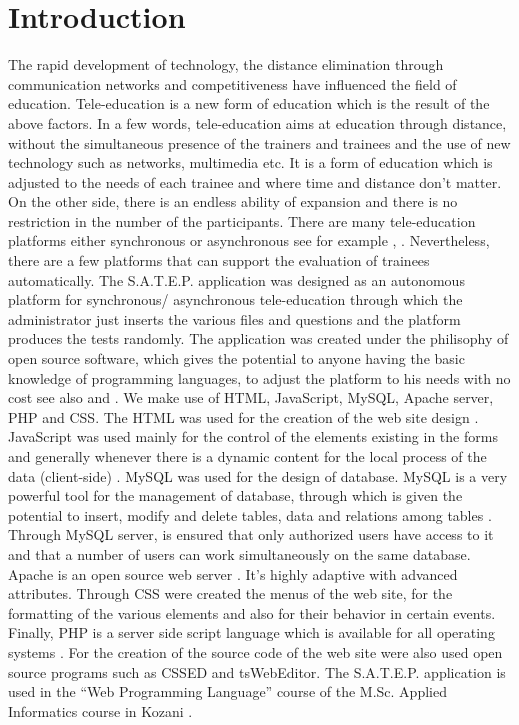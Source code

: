 \documentclass[10pt, conference, compsocconf]{IEEEtran}
\begin{document}
\section{Introduction}
The rapid development of technology, the distance elimination through communication networks and competitiveness have influenced the field of education. Tele-education is a new form of education which is the result of the above factors. In a few words, tele-education aims at education through distance, without the simultaneous presence of the trainers and trainees and the use of new technology such as networks, multimedia etc. It is a form of education which is adjusted to the needs of each trainee and where time and distance don’t matter. On the other side, there is an endless ability of expansion  and there is no restriction in the number of the participants. There are many tele-education platforms either synchronous or asynchronous see for example \cite{Tele1}, \cite{Tele2}. Nevertheless, there are a few platforms that can support the evaluation of trainees automatically.  The S.A.T.E.P. application was designed  as an autonomous platform for synchronous/ asynchronous tele-education  through which the administrator just inserts the various files and questions  and the platform  produces the tests randomly. The application was created under the philisophy of open source software, which gives the potential to anyone having the basic knowledge of programming languages, to adjust the platform to his needs with no cost see also \cite{Skordas_Fragulis_Triant2011} and \cite{Skordas_Fragulis_Triant2014} . We make use  of HTML, JavaScript, MySQL, Apache server, PHP and CSS. The HTML was used for the creation of the web site design\cite {web2008} . JavaScript was used mainly for the control of the elements existing in the forms and generally whenever there is a dynamic content for the local process of the data (client-side) \cite{Java1}. MySQL was used for the design of database.  MySQL is a very powerful tool for the management of database, through which is given the potential to insert, modify and delete tables, data and relations among tables \cite{mysql}. Through MySQL server, is ensured that only authorized users have access to it and that a number of users can work simultaneously on the same database. Apache is an open source web server \cite{apache}. It’s highly adaptive with advanced attributes. Through CSS were created the menus of the web site, for the formatting of the various elements and also for their behavior in certain events. Finally, PHP is a server side script language which is available for all operating systems \cite{php1}. For the creation of the source code of the web site were also used open source programs such as CSSED and tsWebEditor. The S.A.T.E.P. application  is  used in the “Web Programming Language” course of the M.Sc. Applied Informatics course in Kozani .
   
\end{document}
